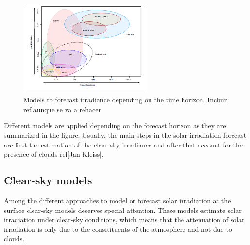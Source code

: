 \begin{figure}[h!]
\centering\includegraphics[width=0.6\textwidth]{figs/forecast.png}
\caption{Models to forecast irradiance depending on the time horizon. Incluir ref aunque se va a rehacer}
\label{fig:forecast}
\end{figure}


Different models are applied depending on the forecast horizon as they are summarized in the figure. Usually, the main steps in the solar irradiation forecast are first the estimation of the clear-sky irradiance and after that account for the presence of clouds ref[Jan Kleiss].



\subsection{Clear-sky models}

Among the different approaches to model or forecast solar irradiation at the surface clear-sky models deserves special attention. These models estimate solar irradiation under clear-sky conditions, which means that the attenuation of solar irradiation is only due to the consitituents of the atmosphere and not due to clouds.

